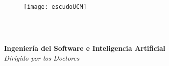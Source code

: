 %
%
%


\begin{titlepage}
    \begin{center}

        {\huge\textbf{ \titulo \\[1em]} \par } 

        \begin{figure}[h]
            \texttt{[image: escudoUCM]}
            \centering \\[3em]
        \end{figure} 

        \textbf\tfg \\[1em]

        \textbf\autor \\[1em]

        \textbf\institucion
        

    \end{center}
\end{titlepage}


\cleardoublepage 

\begin{center}
    
    {\huge\titulo}
    
    \vspace{4cm}

    \textit\tfg \par
    \textbf{Ingeniería del Software e Inteligencia Artificial} \\[2em]

    \textit{Dirigido por los Doctores} \par
    \textbf\tutor

    \vspace{4cm}
    \textbf\institucion
\end{center}





